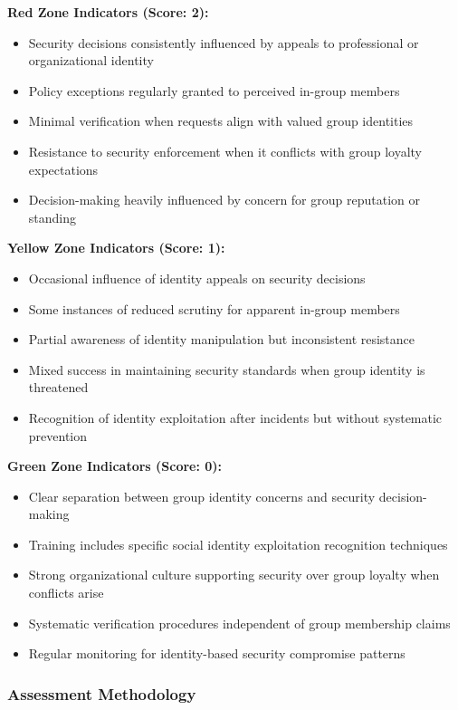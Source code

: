 \documentclass[11pt,a4paper]{article}
\begin{document}
\textbf{Red Zone Indicators (Score: 2):}
\begin{itemize}
\item Security decisions consistently influenced by appeals to professional or organizational identity
\item Policy exceptions regularly granted to perceived in-group members
\item Minimal verification when requests align with valued group identities
\item Resistance to security enforcement when it conflicts with group loyalty expectations
\item Decision-making heavily influenced by concern for group reputation or standing
\end{itemize}

\textbf{Yellow Zone Indicators (Score: 1):}
\begin{itemize}
\item Occasional influence of identity appeals on security decisions
\item Some instances of reduced scrutiny for apparent in-group members
\item Partial awareness of identity manipulation but inconsistent resistance
\item Mixed success in maintaining security standards when group identity is threatened
\item Recognition of identity exploitation after incidents but without systematic prevention
\end{itemize}

\textbf{Green Zone Indicators (Score: 0):}
\begin{itemize}
\item Clear separation between group identity concerns and security decision-making
\item Training includes specific social identity exploitation recognition techniques
\item Strong organizational culture supporting security over group loyalty when conflicts arise
\item Systematic verification procedures independent of group membership claims
\item Regular monitoring for identity-based security compromise patterns
\end{itemize}

\subsubsection{Assessment Methodology}
\end{document}
